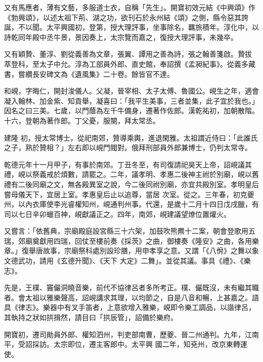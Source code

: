 \begin{pinyinscope}
 又有馬應者，薄有文藝，多服道士衣，自稱「先生」。開寶初效元結《中興頌》作《勃興頌》，以述太祖下荊、湖之功，欲刊石於永州結《頌》之側，縣令惡其誇誕，不以聞。太平興國初，登第，授大理評事，坐事除名，羈旅積年。淳化中，以詩乾同年殿中丞牛景，景因奏上，太宗覽而嘉之，復授大理評事，未幾卒。



 又有穎贄、董淳、劉從義善為文章，張翼、譚用之善為詩，張之翰善箋啟。贄拔
 萃登科，至太子中允。淳為工部員外郎、直史館，奉詔撰《孟昶紀事》。從義多藏書，嘗纘長安碑文為《遺風集》二十卷。餘皆官不達。



 和峴，字晦仁，開封浚儀人。父凝，晉宰相、太子太傅、魯國公。峴生之年，適會凝入翰林、加金紫、知貢舉，凝喜曰：「我平生美事，三者並集，此子宜於我也。」因名之曰三美。七歲，以門蔭為左千牛備身，遷著作佐郎。漢乾祐初，加朝散階。十六，登朝為著作郎。丁父憂，服闋，拜太常丞。



 建隆
 初，授太常博士，從祀南郊，贊導乘輿，進退閑雅。太祖謂近侍曰：「此誰氏之子，熟於贊相？」左右即以峴門閥對。俄拜刑部員外郎兼博士，仍判太常寺。



 乾德元年十一月甲子，有事於南郊。丁丑冬至，有司復請祀昊天上帝，詔峴議其禮，峴以祭義戒於煩數，請罷之。二年，議孝明、孝惠二後神主祔於別廟，峴以舊禮有二後同廟之文，無各殿異室之說，今二後同祔別廟，亦宜共殿別室。孝明皇后嘗母儀天下，宜居上室。孝惠皇后止以追尊，當居
 次室。從之。三年春，初克夔州，以內衣庫使李光睿權知州，峴通判州事。代還，是歲十二月十四日戊戌臘，有司以七日辛卯蠟百神，峴獻議正之。四年，南郊，峴建議望燎位置爟火。



 又嘗言：「依舊典，宗廟殿庭設宮縣三十六架，加鼓吹熊羆十二案，朝會登歌用五瑞，郊廟奠獻用四瑞，回仗至樓前奏《採茨》之曲，御樓奏《隆安》之曲，各用樂章。」復舉唐故事，宗廟祭科處別設珍膳，用申孝享之意。又謂「《八佾》之舞以象文德武功，請用《玄德升聞》、《天下
 大定》二舞」。並從其議。事具《禮》、《樂志》。



 先是，王樸、竇儼洞曉音樂，前代不協律呂者多所考正。樸、儼既沒，未有繼其職者。會太祖以雅樂聲高，詔峴講求其理，以均節之，自是八音和暢，上甚嘉之。語具《律志》。樂器中有叉手笛者，上意欲增入雅樂，峴即令樂工調品，以諧律呂，其執持之狀如拱揖然，請目曰「拱辰管」，詔備於樂府。



 開寶初，遷司勛員外郎、權知泗州，判吏部南曹，歷夔、晉二州通判。九年，江南平，受詔採訪。太宗即位，遷主客郎中。太平興
 國二年，知兗州，改京東轉運使。




\end{pinyinscope}
